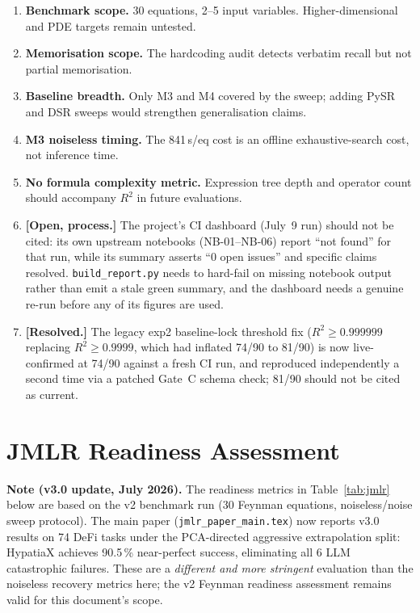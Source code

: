 \documentclass[twoside,11pt]{article}
\newcommand{\Rsq}{R^{2}}
\begin{document}
\begin{enumerate}
  \item \textbf{Benchmark scope.} 30 equations, 2--5 input variables.
    Higher-dimensional and PDE targets remain untested.
  \item \textbf{Memorisation scope.} The hardcoding audit detects verbatim
    recall but not partial memorisation.
  \item \textbf{Baseline breadth.} Only M3 and M4 covered by the sweep;
    adding PySR and DSR sweeps would strengthen generalisation claims.
  \item \textbf{M3 noiseless timing.} The 841\,s/eq cost is an offline
    exhaustive-search cost, not inference time.
  \item \textbf{No formula complexity metric.} Expression tree depth and
    operator count should accompany $\Rsq$ in future evaluations.
  \item \textbf{[Open, process.]} The project's CI dashboard (July~9 run)
    should not be cited: its own upstream notebooks (NB-01--NB-06) report
    ``not found'' for that run, while its summary asserts ``0 open
    issues'' and specific claims resolved. \texttt{build\_report.py}
    needs to hard-fail on missing notebook output rather than emit a
    stale green summary, and the dashboard needs a genuine re-run before
    any of its figures are used.
  \item \textbf{[Resolved.]} The legacy exp2 baseline-lock threshold
    fix ($R^2 \geq 0.999999$ replacing $R^2 \geq 0.9999$, which had
    inflated 74/90 to 81/90) is now live-confirmed at 74/90 against a
    fresh CI run, and reproduced independently a second time via a
    patched Gate~C schema check; 81/90 should not be cited as current.
\end{enumerate}

\section{JMLR Readiness Assessment}
\label{sec:jmlr}

\noindent\textbf{Note (v3.0 update, July 2026).}
The readiness metrics in Table~\ref{tab:jmlr} below are based on the v2
benchmark run (30 Feynman equations, noiseless/noise sweep protocol).
The main paper (\texttt{jmlr\_paper\_main.tex}) now reports v3.0
results on 74 DeFi tasks under the PCA-directed aggressive extrapolation
split: HypatiaX achieves 90.5\,\% near-perfect success, eliminating all 6
LLM catastrophic failures.  These are a \emph{different and more stringent}
evaluation than the noiseless recovery metrics here; the v2 Feynman readiness
assessment remains valid for this document's scope.
\end{document}

